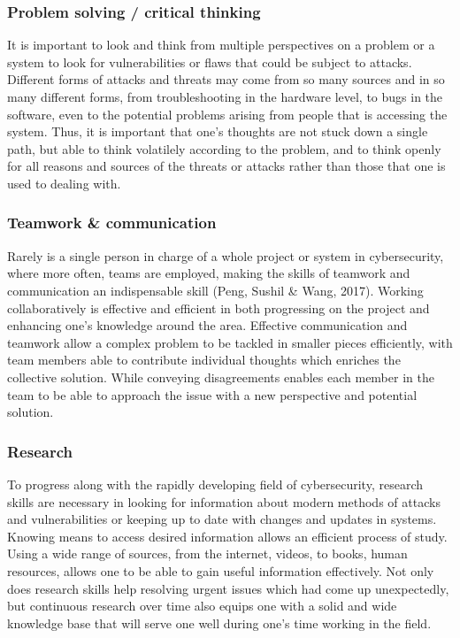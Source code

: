 \documentclass[a4paper, 11pt]{report}
\begin{document}
\subsubsection{Problem solving / critical thinking}
It is important to look and think from multiple perspectives on a problem or a system to look for vulnerabilities or flaws that could be subject to attacks. Different forms of attacks and threats may come from so many sources and in so many different forms, from troubleshooting in the hardware level, to bugs in the software, even to the potential problems arising from people that is accessing the system. Thus, it is important that one’s thoughts are not stuck down a single path, but able to think volatilely according to the problem, and to think openly for all reasons and sources of the threats or attacks rather than those that one is used to dealing with.  
\subsubsection{Teamwork & communication}
Rarely is a single person in charge of a whole project or system in cybersecurity, where more often, teams are employed, making the skills of teamwork and communication an indispensable skill (Peng, Sushil & Wang, 2017). Working collaboratively is effective and efficient in both progressing on the project and enhancing one’s knowledge around the area. Effective communication and teamwork allow a complex problem to be tackled in smaller pieces efficiently, with team members able to contribute individual thoughts which enriches the collective solution. While conveying disagreements enables each member in the team to be able to approach the issue with a new perspective and potential solution.  

\subsubsection{Research}
To progress along with the rapidly developing field of cybersecurity, research skills are necessary in looking for information about modern methods of attacks and vulnerabilities or keeping up to date with changes and updates in systems. Knowing means to access desired information allows an efficient process of study. Using a wide range of sources, from the internet, videos, to books, human resources, allows one to be able to gain useful information effectively. Not only does research skills help resolving urgent issues which had come up unexpectedly, but continuous research over time also equips one with a solid and wide knowledge base that will serve one well during one’s time working in the field.  
\end{document}
